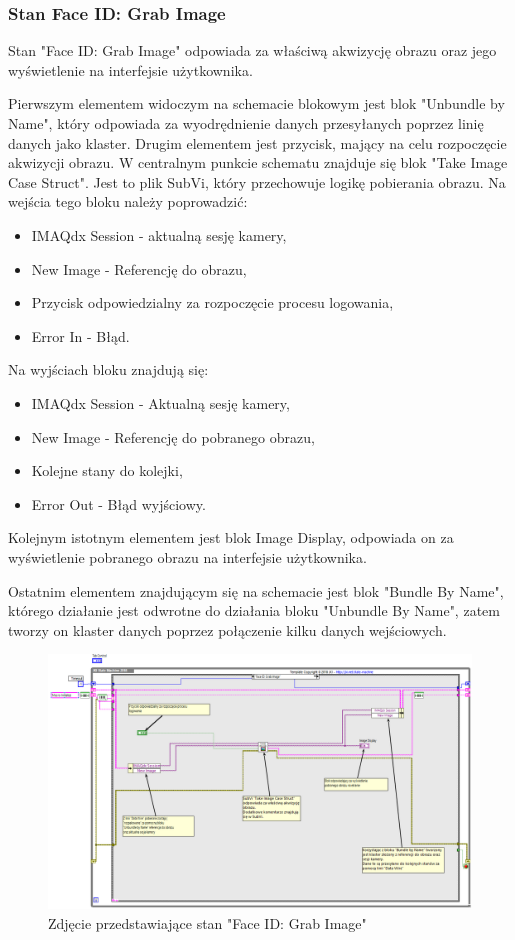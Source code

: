 \documentclass{report}
\begin{document}
\subsubsection{\large Stan Face ID: Grab Image}

Stan "Face ID: Grab Image" odpowiada za właściwą akwizycję obrazu oraz jego wyświetlenie na interfejsie użytkownika. 

Pierwszym elementem widoczym na schemacie blokowym jest blok "Unbundle by Name", który odpowiada za wyodrędnienie danych przesyłanych poprzez linię danych jako klaster. Drugim elementem jest przycisk, mający na celu rozpoczęcie akwizycji obrazu. W centralnym punkcie schematu znajduje się blok "Take Image Case Struct". Jest to plik SubVi, który przechowuje logikę pobierania obrazu. Na wejścia tego bloku należy poprowadzić:
\begin{itemize}
    \item IMAQdx Session - aktualną sesję kamery,
    \item New Image - Referencję do obrazu,
    \item Przycisk odpowiedzialny za rozpoczęcie procesu logowania,
    \item Error In - Błąd.
\end{itemize}

Na wyjściach bloku znajdują się:
\begin{itemize}
    \item IMAQdx Session - Aktualną sesję kamery,
    \item New Image - Referencję do pobranego obrazu,
    \item Kolejne stany do kolejki,
    \item Error Out - Błąd wyjściowy.
\end{itemize}

Kolejnym istotnym elementem jest blok Image Display, odpowiada on za wyświetlenie pobranego obrazu na interfejsie użytkownika.

Ostatnim elementem znajdującym się na schemacie jest blok "Bundle By Name", którego działanie jest odwrotne do działania bloku "Unbundle By Name", zatem tworzy on klaster danych poprzez połączenie kilku danych wejściowych.

\begin{figure}[H]
    \centering
    \includegraphics[width=1.0\textwidth]{src/face-id/face-id-grab.png}
    \caption{Zdjęcie przedstawiające stan "Face ID: Grab Image"}
    \label{fig:face_id-grab}
\end{figure}
\end{document}
